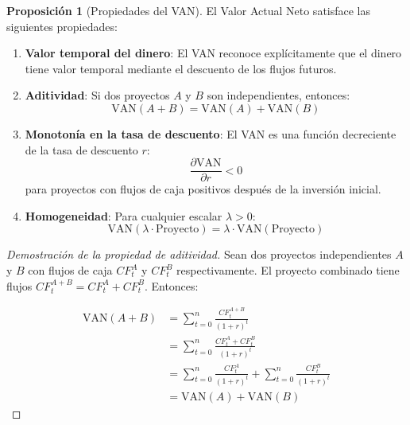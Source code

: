 \documentclass[12pt,a4paper]{article}
\theoremstyle{definition}
\newtheorem{proposicion}{Proposición}[section]
\begin{document}
\begin{center}
    
\end{center}

\begin{proposicion}[Propiedades del VAN]
El Valor Actual Neto satisface las siguientes propiedades:

\begin{enumerate}
\item \textbf{Valor temporal del dinero}: El VAN reconoce explícitamente que el dinero tiene valor temporal mediante el descuento de los flujos futuros.

\item \textbf{Aditividad}: Si dos proyectos $A$ y $B$ son independientes, entonces:
\begin{equation}
\text{VAN}(A + B) = \text{VAN}(A) + \text{VAN}(B)
\end{equation}

\item \textbf{Monotonía en la tasa de descuento}: El VAN es una función decreciente de la tasa de descuento $r$:
\begin{equation}
\frac{\partial \text{VAN}}{\partial r} < 0
\end{equation}
para proyectos con flujos de caja positivos después de la inversión inicial.

\item \textbf{Homogeneidad}: Para cualquier escalar $\lambda > 0$:
\begin{equation}
\text{VAN}(\lambda \cdot \text{Proyecto}) = \lambda \cdot \text{VAN}(\text{Proyecto})
\end{equation}
\end{enumerate}
\end{proposicion}

\begin{proof}[Demostración de la propiedad de aditividad]
Sean dos proyectos independientes $A$ y $B$ con flujos de caja $CF_t^A$ y $CF_t^B$ respectivamente. El proyecto combinado tiene flujos $CF_t^{A+B} = CF_t^A + CF_t^B$. Entonces:

\begin{align*}
\text{VAN}(A + B) &= \sum_{t=0}^{n} \frac{CF_t^{A+B}}{(1+r)^t} \\
&= \sum_{t=0}^{n} \frac{CF_t^A + CF_t^B}{(1+r)^t} \\
&= \sum_{t=0}^{n} \frac{CF_t^A}{(1+r)^t} + \sum_{t=0}^{n} \frac{CF_t^B}{(1+r)^t} \\
&= \text{VAN}(A) + \text{VAN}(B)
\end{align*}
\end{proof}
\end{document}

